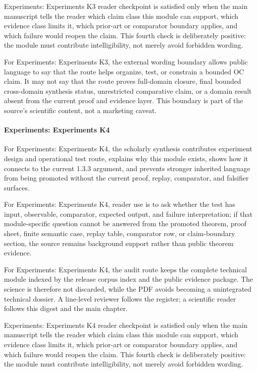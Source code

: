 Experiments: Experiments K3 reader checkpoint is satisfied only when the main manuscript tells the reader which claim class this module can support, which evidence class limits it, which prior-art or comparator boundary applies, and which failure would reopen the claim. This fourth check is deliberately positive: the module must contribute intelligibility, not merely avoid forbidden wording.


For Experiments: Experiments K3, the external wording boundary allows public language to say that the route helps organize, test, or constrain a bounded OC claim. It may not say that the route proves full-domain closure, final bounded cross-domain synthesis status, unrestricted comparative claim, or a domain result absent from the current proof and evidence layer. This boundary is part of the source's scientific content, not a marketing caveat.


\paragraph{Experiments: Experiments K4}

For Experiments: Experiments K4, the scholarly synthesis contributes experiment design and operational test route, explains why this module exists, shows how it connects to the current 1.3.3 argument, and prevents stronger inherited language from being promoted without the current proof, replay, comparator, and falsifier surfaces.


For Experiments: Experiments K4, reader use is to ask whether the test has input, observable, comparator, expected output, and failure interpretation; if that module-specific question cannot be answered from the promoted theorem, proof sheet, finite semantic case, replay table, comparator row, or claim-boundary section, the source remains background support rather than public theorem evidence.


For Experiments: Experiments K4, the audit route keeps the complete technical module indexed by the release corpus index and the public evidence package. The science is therefore not discarded, while the PDF avoids becoming a unintegrated technical dossier. A line-level reviewer follows the register; a scientific reader follows this digest and the main chapter.


Experiments: Experiments K4 reader checkpoint is satisfied only when the main manuscript tells the reader which claim class this module can support, which evidence class limits it, which prior-art or comparator boundary applies, and which failure would reopen the claim. This fourth check is deliberately positive: the module must contribute intelligibility, not merely avoid forbidden wording.


